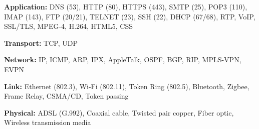 \documentclass[letterpaper, 8pt]{extarticle}
\begin{document}
\begin{multicols*}{4}
	\textbf{Application:} DNS (53), HTTP (80), HTTPS (443), SMTP (25), POP3 (110), IMAP (143), FTP (20/21), TELNET (23), SSH (22), DHCP (67/68), RTP, VoIP, SSL/TLS, MPEG-4, H.264, HTML5, CSS

	\textbf{Transport:} TCP, UDP

	\textbf{Network:} IP, ICMP, ARP, IPX, AppleTalk, OSPF, BGP, RIP, MPLS-VPN, EVPN

	\textbf{Link:} Ethernet (802.3), Wi-Fi (802.11), Token Ring (802.5), Bluetooth, Zigbee, Frame Relay, CSMA/CD, Token passing

	\textbf{Physical:} ADSL (G.992), Coaxial cable, Twisted pair copper, Fiber optic, Wireless transmission media

\end{multicols*}
\end{document}
